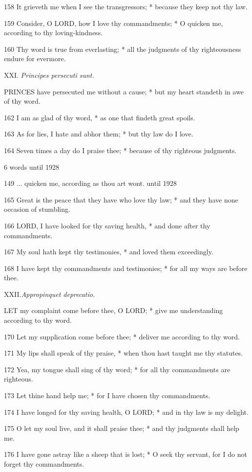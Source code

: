 158 It grieveth me when I see the transgressors; *
because they keep not thy law.

159 Consider, O LORD, how I love thy commandments;
* O quicken me, according to thy loving-kindness.

160 Thy word is true from everlasting; * all the judgments
of thy righteousness endure for evermore.

XXI. \emph{Principes
persecuti sunt.}

PRINCES
have persecuted me without a cause; * but my heart standeth in awe of
thy word.

162 I am as glad of thy word, * as one that findeth
great spoils.

163 As for lies, I hate and abhor them; * but thy law
do I love.

164 Seven times a day do I praise thee; * because of
thy righteous judgments.

6 words
until
1928

149 ... quicken me, according as thou art wont. until
1928

165 Great is the peace that they have who love thy law; * and they have
none occasion of stumbling.

166 LORD, I have looked for thy saving health, * and
done after thy commandments.

167 My soul hath kept thy testimonies, * and loved
them exceedingly.

168 I have kept thy commandments and testimonies; *
for all my ways are before thee.

XXII.\emph{Appropinquet deprecatio.}

LET
my complaint come before thee, O LORD; * give me understanding according
to thy word.

170 Let my supplication come before thee; * deliver
me according to thy word.

171 My lips shall speak of thy praise, * when thou
hast taught me thy statutes.

172 Yea, my tongue shall sing of thy word; * for all
thy commandments are righteous.

173 Let thine hand help me; * for I have chosen thy
commandments.

174 I have longed for thy saving health, O LORD; *
and in thy law is my delight.

175 O let my soul live, and it shall praise thee; *
and thy judgments shall help me.

176 I have gone astray like a sheep that is lost; *
O seek thy servant, for I do not forget thy commandments. 

